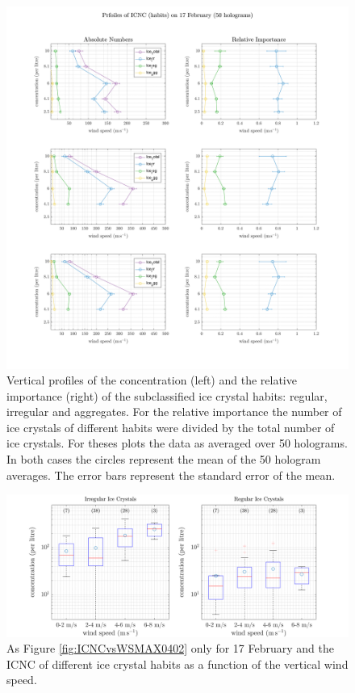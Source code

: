\documentclass[draft,linenumbers]{agujournal}
\begin{document}
\begin{figure}[t]
 \centering
 	\includegraphics[width=14cm]{1702_habitsHeight.png}
 \caption{Vertical profiles of the concentration (left) and the relative importance (right) of the subclassified ice crystal habits: regular, irregular and aggregates. For the relative importance the number of ice crystals of different habits were divided by the total number of ice crystals. For theses plots the data as averaged over 50 holograms. In both cases the circles represent the mean of the 50 hologram averages. The error bars represent the standard error of the mean. }
 \label{fig:profilesHabits1702}
\end{figure}

\begin{figure}[t]
 \centering
 	\includegraphics[width=14cm]{1702_habitswWS.png}
 \caption{As Figure \ref{fig:ICNCvsWSMAX0402} only for 17 February and the ICNC of different ice crystal habits as a function of the vertical wind speed.}
 \label{fig:ICNCvsWindHabits1702}
\end{figure}
\end{document}

